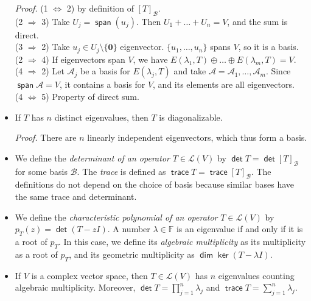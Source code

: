 \documentclass[11pt]{article}
\newcommand{\1}{\mathbf{1}}
\newcommand{\0}{\mathbf{0}}
\newcommand{\A}{\mathcal{A}}
\newcommand{\B}{\mathcal{B}}
\newcommand{\F}{\mathbb{F}}
\newcommand{\cL}{\mathcal{L}}
\DeclareMathOperator{\myspan}{\mathsf{span}}
\DeclareMathOperator{\myker}{\mathsf{ker}}
\DeclareMathOperator{\mydim}{\mathsf{dim}}
\DeclareMathOperator{\mytrace}{\mathsf{trace}}
\DeclareMathOperator{\mydet}{\mathsf{det}}
\begin{document}
\begin{itemize}
\emph{Proof.}
(1 $ \Leftrightarrow $ 2) by definition of $[T]_{\B}$.
\\
(2 $ \Rightarrow $ 3)
Take $U_j = \myspan(u_j)$.
Then $U_1+\dots+U_n=V$, and the sum is direct.
\\
(3 $ \Rightarrow $ 2)
Take $u_j \in U_j \setminus \{\0\}$ eigenvector.
$\{u_1,\dots,u_n\}$ spans $V$, so it is a basis.
\\
(2 $ \Rightarrow $ 4) If eigenvectors span $V$, we have $E(\lambda_1,T) \oplus \dots \oplus E(\lambda_m,T) = V$.
\\
(4 $ \Rightarrow $ 2) Let $\A_j$ be a basis for $E(\lambda_j,T)$ and take $\A = \A_1,\dots,\A_m$. Since $\myspan \A = V$, it contains a basis for $V$, and its elements are all eigenvectors.
\\
(4 $ \Leftrightarrow $ 5) Property of direct sum.

\item

If $T$ has $n$ distinct eigenvalues, then $T$ is diagonalizable.

\emph{Proof.}
There are $n$ linearly independent eigenvectors, which thus form a basis.

\item	

We define the \emph{determinant of an operator} $T \in \cL(V)$ by $\mydet T = \mydet [T]_\B$ for some basis $\B$.
The \emph{trace} is defined as $\mytrace T = \mytrace [T]_\B$.
The definitions do not depend on the choice of basis because similar bases have the same trace and determinant.

\item

We define the \emph{characteristic polynomial of an operator} $T \in \cL(V)$ by $p_T(z) = \mydet(T - z I)$.
A number $\lambda \in \F$ is an eigenvalue if and only if it is a root of $p_T$.
In this case, we define its \emph{algebraic multiplicity} as its multiplicity as a root of $p_T$, and its geometric multiplicity as $\mydim \myker (T - \lambda I)$.

\item

If $V$ is a complex vector space, then $T \in \cL(V)$ has $n$ eigenvalues counting algebraic multiplicity.
Moreover, $\mydet T=\prod_{j=1}^n\lambda_j$ and $\mytrace T=\sum_{j=1}^n\lambda_j$.


\end{itemize}
\end{document}
